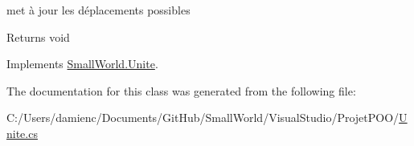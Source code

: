 met à jour les déplacements possibles 

\begin{DoxyReturn}{Returns}
void 
\end{DoxyReturn}


Implements \hyperlink{class_small_world_1_1_unite_a88ea1d2d5962c08ffc15422a2f2c7bbf}{Small\-World.\-Unite}.



The documentation for this class was generated from the following file\-:\begin{DoxyCompactItemize}
\item 
C\-:/\-Users/damienc/\-Documents/\-Git\-Hub/\-Small\-World/\-Visual\-Studio/\-Projet\-P\-O\-O/\hyperlink{_unite_8cs}{Unite.\-cs}\end{DoxyCompactItemize}
